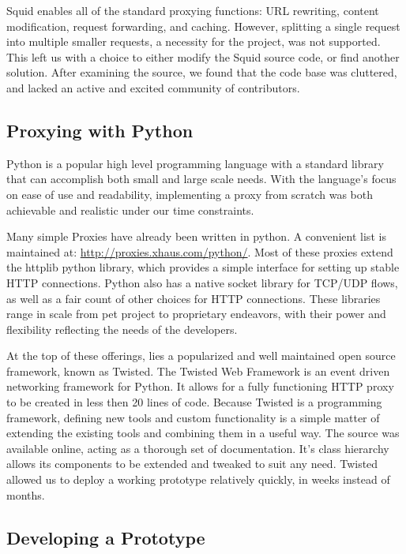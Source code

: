 \documentclass[12pt]{article}
\begin{document}
			Squid enables all of the standard proxying functions: URL rewriting, content modification, request forwarding, and caching. However, splitting a single request into multiple smaller requests, a necessity for the project, was not supported. This left us with a choice to either modify the Squid source code, or find another solution. After examining the source, we found that the code base was cluttered, and lacked an active and excited community of contributors.

		\subsection{Proxying with Python}

			Python is a popular high level programming language with a standard library that can accomplish both small and large scale needs. With the language's focus on ease of use and readability, implementing a proxy from scratch was both achievable and realistic under our time constraints.

			Many simple Proxies have already been written in python. A convenient list is maintained at: \url{http://proxies.xhaus.com/python/}. Most of these proxies extend the httplib python library, which provides a simple interface for setting up stable HTTP connections. Python also has a native socket library for TCP/UDP flows, as well as a fair count of other choices for HTTP connections. These libraries range in scale from pet project to proprietary endeavors, with their power and flexibility reflecting the needs of the developers.
			
			At the top of these offerings, lies a popularized and well maintained open source framework, known as Twisted. The Twisted Web Framework is an event driven networking framework for Python. It allows for a fully functioning HTTP proxy to be created in less then 20 lines of code. Because Twisted is a programming framework, defining new tools and custom functionality is a simple matter of extending the existing tools and combining them in a useful way. The source was available online, acting as a thorough set of documentation. It's class hierarchy allows its components to be extended and tweaked to suit any need. Twisted allowed us to deploy a working prototype relatively quickly, in weeks instead of months.

	\subsection{Developing a Prototype}
\end{document}
